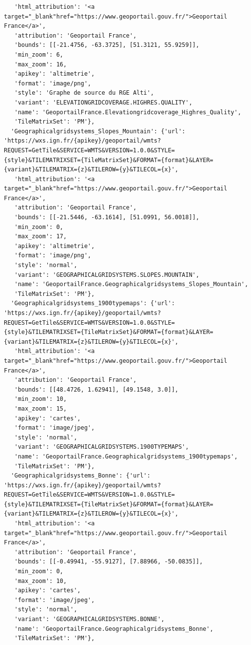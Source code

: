 \documentclass[
  letterpaper,
  DIV=11,
  numbers=noendperiod]{scrreprt}
\begin{document}
\begin{verbatim}
   'html_attribution': '<a target="_blank"href="https://www.geoportail.gouv.fr/">Geoportail France</a>',
   'attribution': 'Geoportail France',
   'bounds': [[-21.4756, -63.3725], [51.3121, 55.9259]],
   'min_zoom': 6,
   'max_zoom': 16,
   'apikey': 'altimetrie',
   'format': 'image/png',
   'style': 'Graphe de source du RGE Alti',
   'variant': 'ELEVATIONGRIDCOVERAGE.HIGHRES.QUALITY',
   'name': 'GeoportailFrance.Elevationgridcoverage_Highres_Quality',
   'TileMatrixSet': 'PM'},
  'Geographicalgridsystems_Slopes_Mountain': {'url': 'https://wxs.ign.fr/{apikey}/geoportail/wmts?REQUEST=GetTile&SERVICE=WMTS&VERSION=1.0.0&STYLE={style}&TILEMATRIXSET={TileMatrixSet}&FORMAT={format}&LAYER={variant}&TILEMATRIX={z}&TILEROW={y}&TILECOL={x}',
   'html_attribution': '<a target="_blank"href="https://www.geoportail.gouv.fr/">Geoportail France</a>',
   'attribution': 'Geoportail France',
   'bounds': [[-21.5446, -63.1614], [51.0991, 56.0018]],
   'min_zoom': 0,
   'max_zoom': 17,
   'apikey': 'altimetrie',
   'format': 'image/png',
   'style': 'normal',
   'variant': 'GEOGRAPHICALGRIDSYSTEMS.SLOPES.MOUNTAIN',
   'name': 'GeoportailFrance.Geographicalgridsystems_Slopes_Mountain',
   'TileMatrixSet': 'PM'},
  'Geographicalgridsystems_1900typemaps': {'url': 'https://wxs.ign.fr/{apikey}/geoportail/wmts?REQUEST=GetTile&SERVICE=WMTS&VERSION=1.0.0&STYLE={style}&TILEMATRIXSET={TileMatrixSet}&FORMAT={format}&LAYER={variant}&TILEMATRIX={z}&TILEROW={y}&TILECOL={x}',
   'html_attribution': '<a target="_blank"href="https://www.geoportail.gouv.fr/">Geoportail France</a>',
   'attribution': 'Geoportail France',
   'bounds': [[48.4726, 1.62941], [49.1548, 3.0]],
   'min_zoom': 10,
   'max_zoom': 15,
   'apikey': 'cartes',
   'format': 'image/jpeg',
   'style': 'normal',
   'variant': 'GEOGRAPHICALGRIDSYSTEMS.1900TYPEMAPS',
   'name': 'GeoportailFrance.Geographicalgridsystems_1900typemaps',
   'TileMatrixSet': 'PM'},
  'Geographicalgridsystems_Bonne': {'url': 'https://wxs.ign.fr/{apikey}/geoportail/wmts?REQUEST=GetTile&SERVICE=WMTS&VERSION=1.0.0&STYLE={style}&TILEMATRIXSET={TileMatrixSet}&FORMAT={format}&LAYER={variant}&TILEMATRIX={z}&TILEROW={y}&TILECOL={x}',
   'html_attribution': '<a target="_blank"href="https://www.geoportail.gouv.fr/">Geoportail France</a>',
   'attribution': 'Geoportail France',
   'bounds': [[-0.49941, -55.9127], [7.88966, -50.0835]],
   'min_zoom': 0,
   'max_zoom': 10,
   'apikey': 'cartes',
   'format': 'image/jpeg',
   'style': 'normal',
   'variant': 'GEOGRAPHICALGRIDSYSTEMS.BONNE',
   'name': 'GeoportailFrance.Geographicalgridsystems_Bonne',
   'TileMatrixSet': 'PM'},

\end{verbatim}
\end{document}
